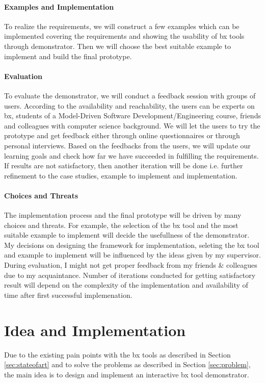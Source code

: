 \paragraph{Examples and Implementation}
To realize the requirements, we will construct a few examples which can be implemented covering the requirements and showing the usability of bx tools through demonstrator. Then we will choose the best suitable example to implement and build the final prototype.
\paragraph{Evaluation} To evaluate the demonstrator, we will conduct a feedback session with groups of users. According to the availability and reachability, the users can be experts on bx, students of a Model-Driven Software Development/Engineering course, friends and colleagues with computer science background. We will let the users to try the prototype and get feedback either through online questionnaires or through personal interviews.
\newline\newline Based on the feedbacks from the users, we will update our learning goals and check how far we have succeeded in fulfilling the requirements. If results are not satisfactory, then another iteration will be done i.e. further refinement to the case studies, example to implement and implementation.
\paragraph{Choices and Threats} 
The implementation process and the final prototype will be driven by many choices and threats. For example, the selection of the bx tool and the most suitable example to implement will decide the usefullness of the demonstrator. My decisions on designing the framework for implementation, seleting the bx tool and example to implement will be influenced by the ideas given by my supervisor. During evaluation, I might not get proper feedback from my friends \& colleagues due to my acquaintance.
\newline\newline Number of iterations conducted for getting satisfactory result will depend on the complexity of the implementation and availability of time after first successful implemenation.

\section{Idea and Implementation}\label{sec:implementation}
Due to the existing pain points with the bx tools as described in Section \ref{sec:stateofart} and to solve the problems as described in Section \ref{sec:problem}, the main idea is to design and implement an interactive bx tool demonstrator.
